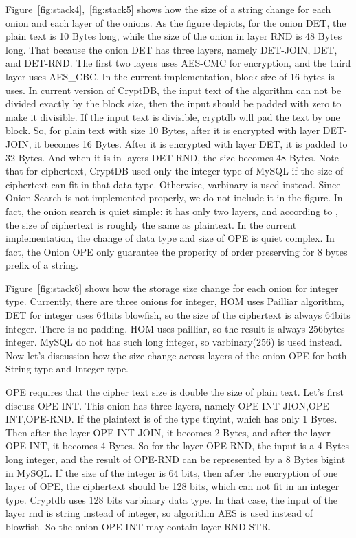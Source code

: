 Figure~\ref{fig:stack4},~\ref{fig:stack5} shows how the size of a string change for each onion and each layer of the onions. As the figure depicts, for the onion DET, the plain text is 10 Bytes long, while the size of the onion in layer RND is 48 Bytes long. That because the onion DET has three layers, namely DET-JOIN, DET, and DET-RND. The first two layers uses AES-CMC for encryption, and the third layer uses AES\_CBC. In the current implementation, block size of 16 bytes is uses. In current version of CryptDB, the input text of the algorithm can not be divided exactly by the block size, then the input should be padded with zero to make it divisible. If the input text is divisible, cryptdb will pad the text by one block. So, for plain text with size 10 Bytes, after it is encrypted with layer DET-JOIN, it becomes 16 Bytes. After it is encrypted with layer DET, it is padded to 32 Bytes. And when it is in layers DET-RND, the size becomes 48 Bytes. Note that for ciphertext, CryptDB used only the integer type of MySQL if the size of ciphertext can fit in that data type. Otherwise, varbinary is used instead. Since Onion Search is not implemented properly, we do not include it in the figure. In fact, the onion search is quiet simple: it has only two layers, and according to \citep{song2000practical}, the size of ciphertext is roughly the same as plaintext. In the current implementation, the change of data type and size of OPE is quiet complex. In fact, the Onion OPE only guarantee the properity of order preserving for 8 bytes prefix of a string.






Figure~\ref{fig:stack6} shows how the storage size change for each onion for integer type. Currently, there are three onions for integer, HOM uses Pailliar algorithm, DET for integer uses 64bits blowfish, so the size of the ciphertext is always 64bits integer. There is no padding. HOM uses pailliar, so the result is always 256bytes integer. MySQL do not has such long integer, so varbinary(256) is used instead. Now let's discussion how the size change across layers of the onion OPE for both String type and Integer type. 



OPE requires that the cipher text size is double the size of plain text. Let's first discuss OPE-INT. This onion has three layers, namely OPE-INT-JION,OPE-INT,OPE-RND. If the plaintext is of the type tinyint, which has only 1 Bytes. Then after the layer OPE-INT-JOIN, it becomes 2 Bytes, and after the layer OPE-INT, it becomes 4 Bytes. So for the layer OPE-RND, the input is a 4 Bytes long integer, and the result of OPE-RND can be represented by a 8 Bytes bigint in MySQL. If the size of the integer is 64 bits, then after the encryption of one layer of OPE, the ciphertext should be 128 bits, which can not fit in an integer type. Cryptdb uses 128 bits varbinary data type. In that case, the input of the layer rnd is string instead of integer, so algorithm AES is used instead of blowfish. So the onion OPE-INT may contain layer RND-STR. 

